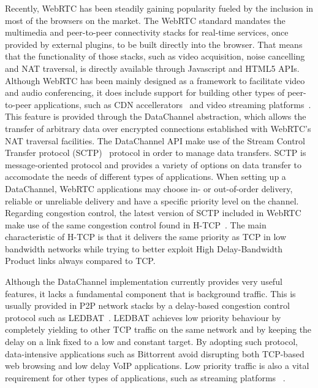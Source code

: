 \documentclass{sig-alternate}
\begin{document}

Recently, WebRTC has been steadily gaining popularity fueled by the inclusion in most of
the browsers on the market. The WebRTC standard mandates the multimedia and peer-to-peer
connectivity stacks for real-time services, once provided by external plugins, to be built
directly into the browser. That means that the functionality of those stacks, such as
video acquisition, noise cancelling and NAT traversal, is directly available through
Javascript and HTML5 APIs. Although WebRTC has been mainly designed as a framework to
facilitate video and audio conferencing, it does include support for building other types
of peer-to-peer applications, such as CDN accellerators~\cite{peerCDN} and video streaming
platforms~\cite{nurminen2013p2p}. This feature is provided through the DataChannel
abstraction, which allows the transfer of arbitrary data over encrypted connections
established with WebRTC's NAT traversal facilities. The DataChannel API make use of the
Stream Control Transfer protocol (SCTP)~\cite{sctp} protocol in order to manage data
transfers. SCTP is message-oriented protocol and provides a variety of options on data
transfer to accomodate the needs of different types of applications. When setting up a
DataChannel, WebRTC applications may choose in- or out-of-order delivery, reliable or
unreliable delivery and have a specific priority level on the channel. Regarding
congestion control, the latest version of SCTP included in WebRTC make use of the same
congestion control found in H-TCP~\cite{htcp}. The main characteristic of H-TCP is that it
delivers the same priority as TCP in low bandwidth networks while trying to better exploit
High Delay-Bandwidth Product links always compared to TCP.

Although the DataChannel implementation currently provides very useful features, it lacks
a fundamental component that is background traffic. This is usually provided in P2P
network stacks by a delay-based congestion control protocol such as LEDBAT~\cite{ledbat}. 
LEDBAT achieves low priority behaviour by completely yielding to other TCP traffic on the same
network and by keeping the delay on a link fixed to a low and constant target. By adopting
such protocol, data-intensive applications such as Bittorrent avoid disrupting both
TCP-based web browsing and low delay VoIP applications. Low priority traffic is also a
vital requirement for other types of applications, such as streaming
platforms ~\cite{smoothcache}\cite{roberto-thesis}.
\end{document}
